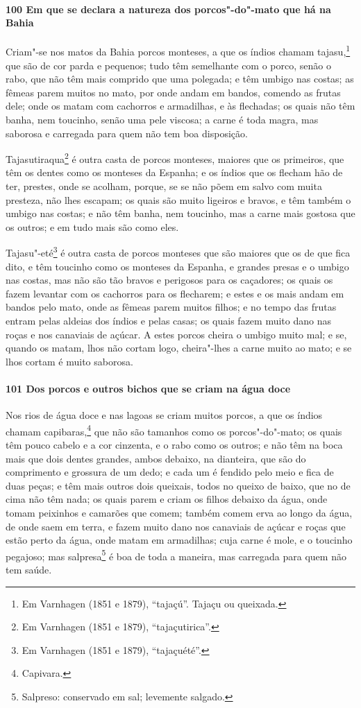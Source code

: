 \begin{linenumbers}
\paragraph{100 Em que se declara a natureza dos porcos"-do"-mato que há na Bahia}\quad
Criam"-se nos matos da Bahia porcos monteses, a que os índios chamam tajasu,\footnote{ Em
Varnhagen (1851 e 1879), ``tajaçú''. Tajaçu ou queixada.} que são de cor parda e
pequenos; tudo têm semelhante com o porco, senão o rabo, que não têm mais comprido que uma
polegada; e têm umbigo nas costas; as fêmeas parem muitos no mato, por onde andam em
bandos, comendo as frutas dele; onde os matam com cachorros e armadilhas, e às flechadas;
os quais não têm banha, nem toucinho, senão uma pele viscosa; a carne é toda magra, mas
saborosa e carregada para quem não tem boa disposição.

Tajasutiraqua\footnote{ Em Varnhagen (1851 e 1879), ``tajaçutirica''.} é outra casta de
porcos monteses, maiores que os primeiros, que têm os dentes como os monteses da Espanha;
e os índios que os flecham hão de ter, prestes, onde se acolham, porque, se se não põem em
salvo com muita presteza, não lhes escapam; os quais são muito ligeiros e bravos, e têm
também o umbigo nas costas; e não têm banha, nem toucinho, mas a carne mais gostosa que os
outros; e em tudo mais são como eles.

Tajasu"-eté\footnote{ Em Varnhagen (1851 e 1879), ``tajaçuété''.} é outra casta de porcos
monteses que são maiores que os de que fica dito, e têm toucinho como os monteses da
Espanha, e grandes presas e o umbigo nas costas, mas não são tão bravos e perigosos para
os caçadores; os quais os fazem levantar com os cachorros para os flecharem; e estes e os
mais andam em bandos pelo mato, onde as fêmeas parem muitos filhos; e no tempo das frutas
entram pelas aldeias dos índios e pelas casas; os quais fazem muito
dano nas roças e nos canaviais de açúcar. A estes porcos cheira o umbigo muito mal; e se,
quando os matam, lhos não cortam logo, cheira"-lhes a carne muito ao mato; e se lhos cortam
é muito saborosa.

\paragraph{101 Dos porcos e outros bichos que se criam na água doce}\quad
Nos rios de água doce e nas lagoas se criam muitos porcos, a que os índios chamam
capibaras,\footnote{ Capivara.} que não são tamanhos como os porcos"-do"-mato; os quais têm
pouco cabelo e a cor cinzenta, e o rabo como os outros; e não têm na boca mais que dois
dentes grandes, ambos debaixo, na dianteira, que são do comprimento e grossura de um dedo;
e cada um é fendido pelo meio e fica de duas peças; e têm mais outros dois queixais, todos
no queixo de baixo, que no de cima não têm nada; os quais parem e criam os filhos debaixo
da água, onde tomam peixinhos e camarões que comem; também comem erva ao longo da água, de
onde saem em terra, e fazem muito dano nos canaviais de açúcar e roças que estão perto da
água, onde matam em armadilhas; cuja carne é mole, e o toucinho pegajoso; mas
salpresa\footnote{ Salpreso: conservado em sal; levemente salgado.} é boa de toda a
maneira, mas carregada para quem não tem saúde.


\end{linenumbers}
